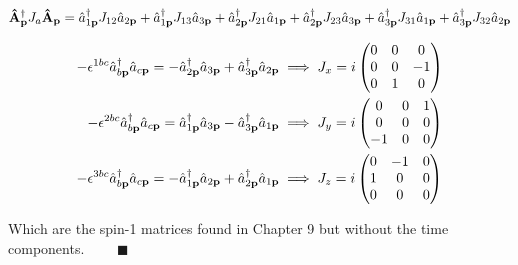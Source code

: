 \documentclass{article}
\begin{document}
\begin{align*}
  \vb{\hat{A}}^\dagger_{\vb{p}}J_a\vb{\hat{A}}_{\vb{p}} & =
  \hat{a}^\dagger_{1\vb{p}}J_{12}\hat{a}_{2\vb{p}} + \hat{a}^\dagger_{1\vb{p}}J_{13}\hat{a}_{3\vb{p}}
  +\hat{a}^\dagger_{2\vb{p}}J_{21}\hat{a}_{1\vb{p}} + \hat{a}^\dagger_{2\vb{p}}J_{23}\hat{a}_{3\vb{p}}
  +\hat{a}^\dagger_{3\vb{p}}J_{31}\hat{a}_{1\vb{p}} + \hat{a}^\dagger_{3\vb{p}}J_{32}\hat{a}_{2\vb{p}} \\
\end{align*}



\begin{align*}
  -\epsilon^{1bc}\hat{a}^\dagger_{b\vb{p}}\hat{a}_{c\vb{p}}  =-\hat{a}^\dagger_{2\vb{p}}\hat{a}_{3\vb{p}}+\hat{a}^\dagger_{3\vb{p}}\hat{a}_{2\vb{p}} & \implies J_x=i\begin{pmatrix}
    0 & 0 & 0  \\
    0 & 0 & -1 \\
    0 & 1 & 0  \\
  \end{pmatrix} \\
  -\epsilon^{2bc}\hat{a}^\dagger_{b\vb{p}}\hat{a}_{c\vb{p}}  =\hat{a}^\dagger_{1\vb{p}}\hat{a}_{3\vb{p}}-\hat{a}^\dagger_{3\vb{p}}\hat{a}_{1\vb{p}}  & \implies J_y=i\begin{pmatrix}
    0  & 0 & 1 \\
    0  & 0 & 0 \\
    -1 & 0 & 0 \\
  \end{pmatrix} \\
  -\epsilon^{3bc}\hat{a}^\dagger_{b\vb{p}}\hat{a}_{c\vb{p}}  =-\hat{a}^\dagger_{1\vb{p}}\hat{a}_{2\vb{p}}+\hat{a}^\dagger_{2\vb{p}}\hat{a}_{1\vb{p}} & \implies J_z=i\begin{pmatrix}
    0 & -1 & 0 \\
    1 & 0  & 0 \\
    0 & 0  & 0 \\
  \end{pmatrix} \\
\end{align*}

Which are the spin-1 matrices found in Chapter 9 but without the time components. $\qquad\blacksquare$
\end{document}
